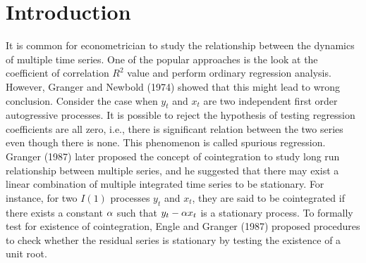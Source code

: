\chapter{Introduction}
\ifpdf
    \graphicspath{{Introduction/IntroductionFigs/PNG/}{Introduction/IntroductionFigs/PDF/}{Introduction/IntroductionFigs/}}
\else
    \graphicspath{{Introduction/IntroductionFigs/EPS/}{Introduction/IntroductionFigs/}}
\fi

It is common for econometrician to study the relationship between the dynamics of multiple time series. One of the popular approaches is the look at the coefficient of correlation $R^2$ value and perform ordinary regression analysis. However, Granger and Newbold (1974) showed that this might lead to wrong conclusion. Consider the case when $y_t$ and $x_t$ are two independent first order autogressive processes. It is possible to reject the hypothesis of testing regression coefficients are all zero, i.e., there is significant relation between the two series even though there is none. This phenomenon is called spurious regression. Granger (1987) later proposed the concept of cointegration to study long run relationship between multiple series, and he suggested that there may exist a linear combination of multiple integrated time series to be stationary. For instance, for two $I(1)$ processes $y_t$ and $x_t$, they are said to be cointegrated if there exists a constant $\alpha$ such that $y_t - \alpha x_t$ is a stationary process. To formally test for existence of cointegration, Engle and Granger (1987) proposed procedures to check whether the residual series is stationary by testing the existence of a unit root.

